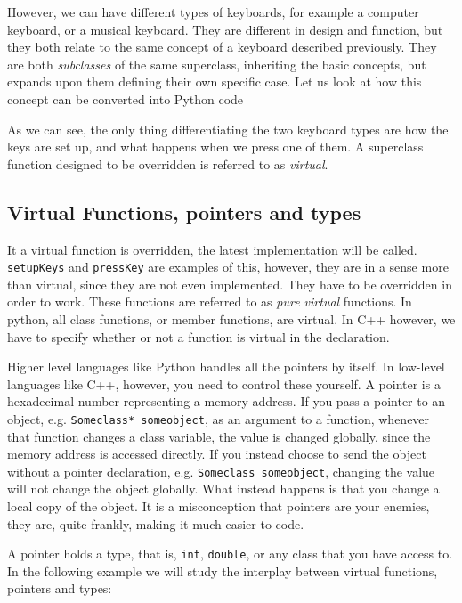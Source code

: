 However, we can have different types of keyboards, for example a computer keyboard, or a musical keyboard. They are different in design and function, but they both relate to the same concept of a keyboard described previously. They are both \textit{subclasses} of the same superclass, inheriting the basic concepts, but expands upon them defining their own specific case. Let us look at how this concept can be converted into Python code

\vspace{0.5 cm}


As we can see, the only thing differentiating the two keyboard types are how the keys are set up, and what happens when we press one of them. A superclass function designed to be overridden is referred to as \textit{virtual}. 

\subsection{Virtual Functions, pointers and types}

It a virtual function is overridden, the latest implementation will be called. \verb+setupKeys+ and \verb+pressKey+ are examples of this, however, they are in a sense more than virtual, since they are not even implemented. They have to be overridden in order to work. These functions are referred to as \textit{pure virtual} functions. In python, all class functions, or member functions, are virtual. In C++ however, we have to specify whether or not a function is virtual in the declaration. 

Higher level languages like Python handles all the pointers by itself. In low-level languages like C++, however, you need to control these yourself. A pointer is a hexadecimal number representing a memory address. If you pass a pointer to an object, e.g. \verb+Someclass* someobject+, as an argument to a function, whenever that function changes a class variable, the value is changed globally, since the memory address is accessed directly. If you instead choose to send the object without a pointer declaration, e.g. \verb+Someclass someobject+, changing the value will not change the object globally. What instead happens is that you change a local copy of the object. It is a misconception that pointers are your enemies, they are, quite frankly, making it much easier to code.

A pointer holds a type, that is, \verb+int+, \verb+double+, or any class that you have access to. In the following example we will study the interplay between virtual functions, pointers and types:

